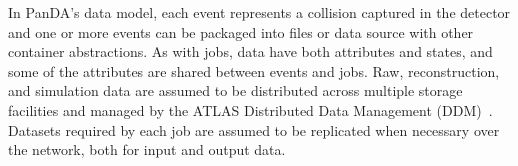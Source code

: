 
In PanDA's data model, each event represents a collision captured in the
detector and one or more events can be packaged into files or data source with
other container abstractions. As with jobs, data have both attributes and
states, and some of the attributes are shared between events and jobs.
Raw, reconstruction, and simulation data are assumed to be distributed across
multiple storage facilities and managed by the ATLAS Distributed Data Management
(DDM)~\cite{garonne2012atlas}. Datasets required by each job are assumed to be
replicated when necessary over the network, both for input and output data.


